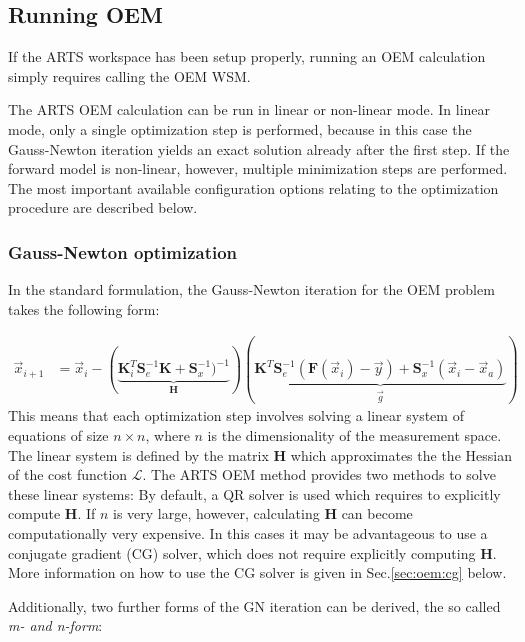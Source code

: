 \subsection{Running OEM}

If the ARTS workspace has been setup properly, running an OEM calculation
simply requires calling the OEM WSM. 

The ARTS OEM calculation can be run in linear or non-linear mode. In linear
mode, only a single optimization step is performed, because in this case 
the Gauss-Newton iteration yields an exact solution already after the
first step. If the forward model is non-linear, however,
 multiple minimization steps are performed. The most important available
configuration options relating to the optimization procedure are described
below.

\subsubsection{Gauss-Newton optimization}
\label{ref:oem:gn}

In the standard formulation, the Gauss-Newton iteration for the OEM problem
takes the following form:

\begin{eqnarray}\label{eq:oem:gn}
\vec{x}_{i + 1} &= \vec{x}_i - 
\left ( \underbrace{\mathbf{K}_i^T \mathbf{S}_e^{-1} \mathbf{K} + \mathbf{S}^{-1}_x)^{-1} }_{ \mathbf{H}}\right )
\left(\underbrace{\mathbf{K}^T\mathbf{S}^{-1}_e (\mathbf{F}(\vec{x}_i) - \vec{y}) + \mathbf{S}_x^{-1}(\vec{x}_i - \vec{x}_a)}_{\vec{g}} \right)
\end{eqnarray}
This means that each optimization step involves solving a linear system of equations
 of size $n \times n$, where $n$ is the dimensionality of the measurement space.
The linear system is defined by the matrix $\mathbf{H}$ which approximates the
the Hessian of the cost function $\mathcal{L}$. The ARTS OEM method provides two methods
to solve these linear systems: By default, a QR solver is used which requires to
explicitly compute $\mathbf{H}$. If $n$ is very large, however, calculating
 $\mathbf{H}$ can become computationally very expensive. In this cases it may be
 advantageous to use a conjugate gradient (CG) solver, which does not require explicitly
computing $\mathbf{H}$. More information on how to use the CG solver is given in
 Sec.\ref{sec:oem:cg} below.

Additionally, two further forms of the GN iteration can be derived, the so called
\textit{m- and n-form}:


